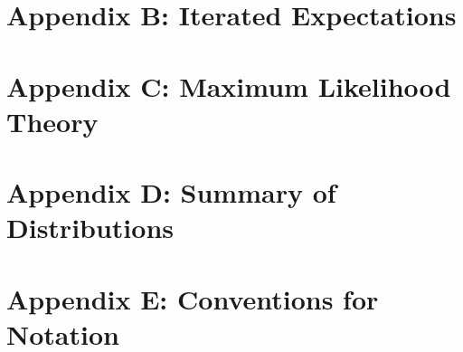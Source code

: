 \documentclass[
]{book}
\begin{document}
\hypertarget{appendix-b-iterated-expectations}{%
\chapter{Appendix B: Iterated Expectations}\label{appendix-b-iterated-expectations}}

\hypertarget{appendix-c-maximum-likelihood-theory}{%
\chapter{Appendix C: Maximum Likelihood Theory}\label{appendix-c-maximum-likelihood-theory}}

\hypertarget{appendix-d-summary-of-distributions}{%
\chapter{Appendix D: Summary of Distributions}\label{appendix-d-summary-of-distributions}}

\hypertarget{appendix-e-conventions-for-notation}{%
\chapter{Appendix E: Conventions for Notation}\label{appendix-e-conventions-for-notation}}

\hypertarget{section}{%
\chapter*{}\label{section}}
\end{document}
